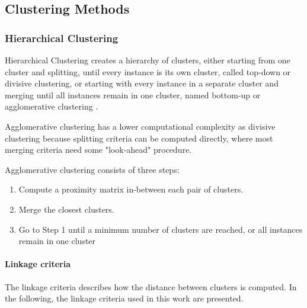 		\subsection{Clustering Methods}
		\label{subsec:clustering}
			\subsubsection{Hierarchical Clustering}
			\label{subsubsec:hirach}
				
				Hierarchical Clustering creates a hierarchy of clusters, either starting from one cluster and splitting, until every instance is its own cluster, called top-down or divisive clustering, or starting with every instance in a separate cluster and merging until all instances remain in one cluster, named bottom-up or agglomerative clustering \cite{Jain99}.

				Agglomerative clustering has a lower computational complexity as divisive clustering because splitting criteria can be computed directly, where most merging criteria need some "look-ahead" procedure. 

				Agglomerative clustering consists of three steps:
				
				\begin{enumerate} 
					\item{Compute a proximity matrix in-between each pair of clusters.}
					\item{Merge the closest clusters.}
					\item{Go to Step 1 until a minimum number of clusters are reached, or all instances remain in one cluster}
				\end{enumerate}

				\paragraph{Linkage criteria}
					The linkage criteria describes how the distance between clusters is computed. In the following, the linkage criteria used in this work are presented.

